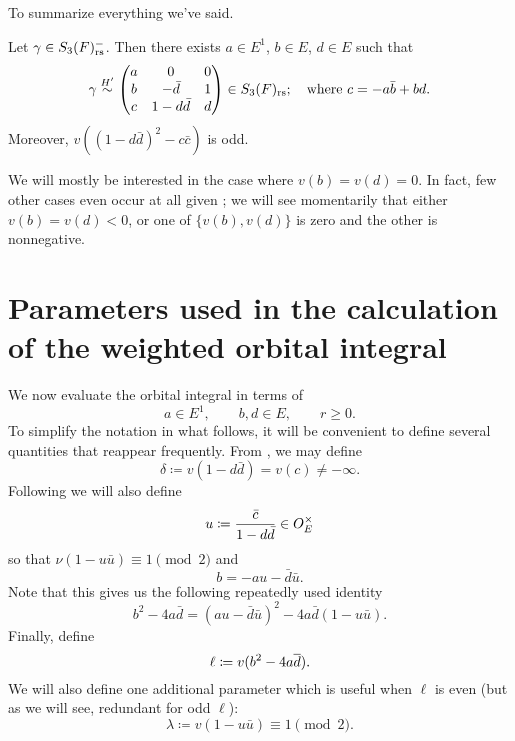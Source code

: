 To summarize everything we've said.
\begin{lemma}
  \label{lem:S3_abcd}
  Let $\gamma \in S_3(F)_{\mathrm{rs}}^-$.
  Then there exists $a \in E^1$, $b \in E$, $d \in E$ such that
  \[ \gamma \overset{H'}{\sim}
    \begin{pmatrix}
      a & 0 & 0 \\
      b & - \bar d & 1 \\
      c & 1 - d \bar d & d
    \end{pmatrix}
    \in S_3(F)_{\mathrm{rs}}; \quad \text{where $c = -a \bar b + b d$}. \]
  Moreover, $v\left( (1-d \bar d)^2 - c \bar c \right)$ is odd.
\end{lemma}

We will mostly be interested in the case where $v(b) = v(d) = 0$.
In fact, few other cases even occur at all given ;
we will see momentarily that either $v(b) = v(d) < 0$,
or one of $\{v(b), v(d)\}$ is zero and the other is nonnegative.

\section{Parameters used in the calculation of the weighted orbital integral}
\label{sec:param_orbital0}

We now evaluate the orbital integral in terms of
\[ a \in E^1, \qquad b, d \in E, \qquad r \ge 0. \]
To simplify the notation in what follows,
it will be convenient to define several quantities that reappear frequently.
From , we may define
\begin{equation}
  \delta \coloneqq v(1-d \bar d) = v(c) \neq -\infty.
  \label{eq:delta}
\end{equation}
Following \cite[Equation (4.3)]{ref:AFL} we will also define
\begin{equation}
  u \coloneqq \frac{\bar c}{1-d \bar d} \in O_E^\times
  \label{eq:u}
\end{equation}
so that $\nu(1-u \bar u) \equiv 1 \pmod 2$ and
\begin{equation}
  b = -au - \bar{d} \bar{u}.
  \label{eq:b}
\end{equation}
Note that this gives us the following repeatedly used identity
\begin{equation}
  b^2-4a\bar d = (au-\bar d \bar u)^2 - 4a\bar d(1-u\bar u).
  \label{eq:dos}
\end{equation}
Finally, define
\begin{equation}
  \ell \coloneqq v(b^2 - 4 a \overline d).
  \label{eq:ell}
\end{equation}
We will also define one additional parameter which is useful when $\ell$ is even
(but as we will see, redundant for odd $\ell$):
\begin{equation}
  \lambda \coloneqq v(1-u \bar u) \equiv 1 \pmod 2.
  \label{eq:lambda}
\end{equation}

